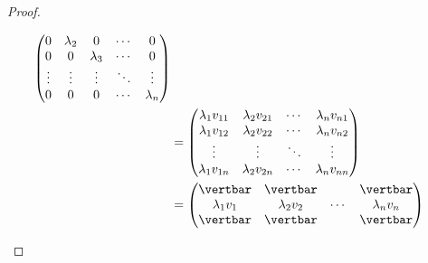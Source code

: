 \begin{proof}
\begin{flushleft}
\begin{align*}
\begin{pmatrix}
				0         & \lambda_2 & 0         & \cdots & 0         \\
				0         & 0         & \lambda_3 & \cdots & 0         \\
				\vdots    & \vdots    & \vdots    & \ddots & \vdots    \\
				0         & 0         & 0         & \cdots & \lambda_n
			\end{pmatrix}                                       \\
			                                   & =\begin{pmatrix}
				\lambda_1 v_{11} & \lambda_2 v_{21} & \cdots & \lambda_n v_{n1} \\
				\lambda_1 v_{12} & \lambda_2 v_{22} & \cdots & \lambda_n v_{n2} \\
				\vdots           & \vdots           & \ddots & \vdots           \\
				\lambda_1 v_{1n} & \lambda_2 v_{2n} & \cdots & \lambda_n v_{nn}
			\end{pmatrix} \\
			                                   & =\begin{pmatrix}
				\vertbar      & \vertbar      &        & \vertbar      \\
				\lambda_1 v_1 & \lambda_2 v_2 & \cdots & \lambda_n v_n \\
				\vertbar      & \vertbar      &        & \vertbar
			\end{pmatrix}
		\end{align*}
	\end{flushleft}
\end{proof}

